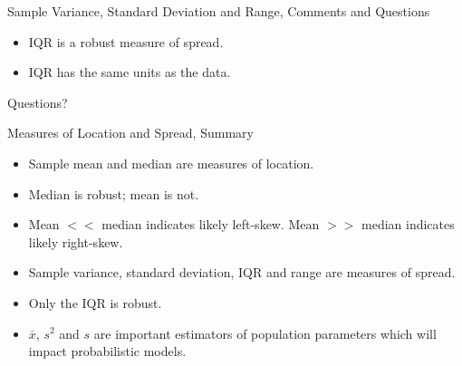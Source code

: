 \documentclass{beamer}
\newcommand{\blue}[1]{{\color{blue} #1}}
\newcommand{\red}[1]{{\color{red} #1}}
\newcommand{\qtns}[0]{\begin{center} Questions? \end{center}}
\begin{document}

\begin{frame}{Sample Variance, Standard Deviation and Range, Comments and Questions}
    \begin{itemize}
        \item IQR is a robust measure of spread.
        \item IQR has the same units as the data.
    \end{itemize}
    \qtns
\end{frame}

\begin{frame}{Measures of Location and Spread, Summary}
    \begin{itemize}
        \item Sample mean and median are measures of location. 
        \item Median is robust; mean is not.
        \item Mean $<<$ median indicates likely left-skew. Mean $>>$ median indicates likely right-skew.
        \item Sample variance, standard deviation, IQR and range are measures of spread. 
        \item Only the IQR is robust.
        \item $\overline{x}$, $s^2$ and $s$ are important estimators of population parameters which will impact probabilistic models.
    \end{itemize}
\end{frame}
\end{document}
